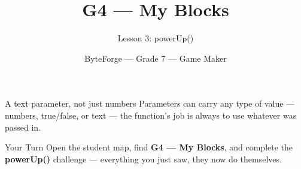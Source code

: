 \documentclass[aspectratio=169]{beamer}
\title{G4 — My Blocks}
\subtitle{Lesson 3: powerUp()}
\author{ByteForge --- Grade 7 --- Game Maker}
\date{}
\begin{document}
\begin{frame}
    \titlepage
\end{frame}

\begin{frame}{A text parameter, not just numbers}
    \Large
    Parameters can carry any type of value — numbers, true/false, or text — the function's job is always to use whatever was passed in.
\end{frame}

\begin{frame}{Your Turn}
    \Large
    Open the student map, find \textbf{G4 — My Blocks}, and complete
    the \textbf{powerUp()} challenge --- everything you just saw, they now do themselves.
\end{frame}
\end{document}
